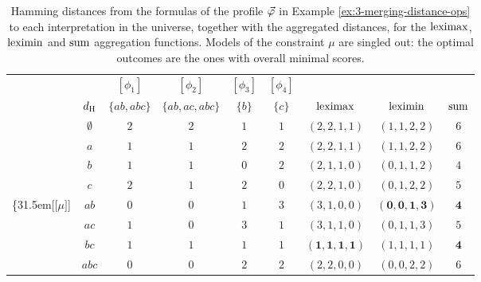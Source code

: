 \begin{table}\centering
	\begin{tabular}{ccccccccc}
	\cmidrule{2-9}
					  &
					  &
	$[\phi_1]$        &
	$[\phi_2]$        &
	$[\phi_3]$        &
	$[\phi_4]$        &
					  &
					  &
					  \\

					  &
	$\dd_\hamming$  & 
	$\{ab,abc\}$      & 
	$\{ab, ac, abc\}$ & 
	$\{b\}$           & 
	$\{c\}$           &  
	$\leximax$        & 
	$\leximin$        & 
	$\ssum$ 		  \\  	
	\cmidrule{2-9}

					  &
	$\emptyset$       &
	$2$               &
	$2$               & 
	$1$               & 
	$1$               & 
	$(2,2,1,1)$       & 
	$(1,1,2,2)$       & 
	$6$               \\
					  
					  &
	$a$               &
	$1$               &
	$1$               & 
	$2$               & 
	$2$               & 
	$(2,2,1,1)$       & 
	$(1,1,2,2)$       & 
	$6$               \\

	                  &
	$b$               &
	$1$               &
	$1$               & 
	$0$               & 
	$2$               & 
	$(2,1,1,0)$       & 
	$(0,1,1,2)$       & 
	$4$               \\

					  &
	$c$               &
	$2$               &
	$1$               & 
	$2$               & 
	$0$               & 
	$(2,2,1,0)$       & 
	$(0,1,2,2)$       & 
	$5$               \\

	\ldelim\{{3}{1.5em}[${[}\mu{]}$] &
	$ab$              &
	$0$               &
	$0$               & 
	$1$               & 
	$3$               & 
	$(3,1,0,0)$       & 
	$\mathbf{(0,0,1,3)}$       & 
	$\mathbf{4}$               \\

				      &
	$ac$              &
	$1$               &
	$0$               & 
	$3$               & 
	$1$               & 
	$(3,1,1,0)$       & 
	$(0,1,1,3)$       & 
	$5$               \\

					  &
	$bc$              &
	$1$               &
	$1$               & 
	$1$               & 
	$1$               & 
	$\mathbf{(1,1,1,1)}$       & 
	$(1,1,1,1)$       & 
	$\mathbf{4}$               \\

					  &	
	$abc$             &
	$0$               &
	$0$               & 
	$2$               & 
	$2$               & 
	$(2,2,0,0)$       & 
	$(0,0,2,2)$       & 
	$6$               \\
	\cmidrule{2-9}
	\end{tabular}
	\caption{
		Hamming distances from the formulas of the profile $\P$ 
		in Example \ref{ex:3-merging-distance-ops} to each
		interpretation in the universe,
		together with the aggregated distances,
		for the $\leximax$, $\leximin$ and $\ssum$ aggregation 
		functions.
		Models of the constraint $\mu$ are singled out:
		the optimal outcomes are the ones with overall 
		minimal scores.
	}
	\label{tab:3-merging-hamming-distances}
\end{table}

